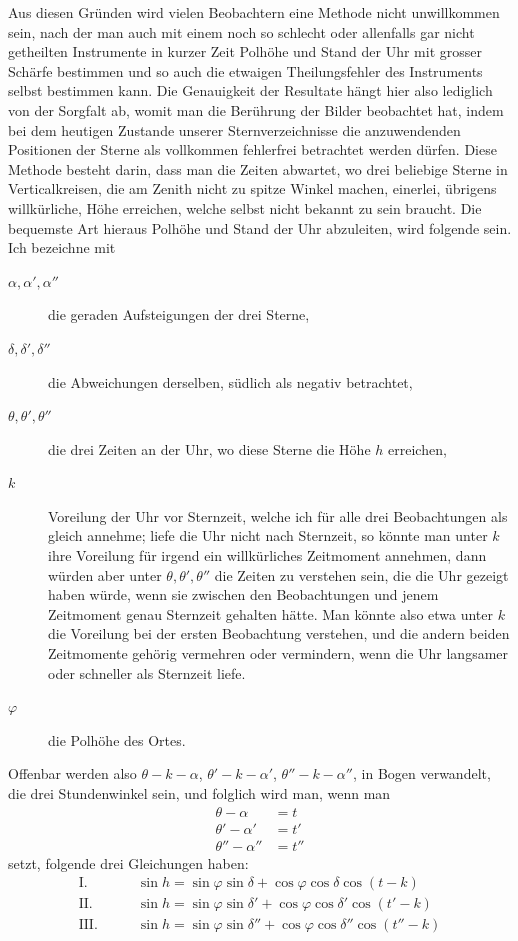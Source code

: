 Aus diesen Gründen wird vielen Beobachtern eine Methode nicht unwillkommen
sein, nach der man auch mit einem noch so schlecht oder allenfalls gar
nicht getheilten Instrumente in kurzer Zeit Polhöhe und Stand der Uhr mit
grosser Schärfe bestimmen und so auch die etwaigen Theilungsfehler des Instruments
selbst bestimmen kann. Die Genauigkeit der Resultate hängt hier also
lediglich von der Sorgfalt ab, womit man die Berührung der Bilder beobachtet
hat, indem bei dem heutigen Zustande unserer Sternverzeichnisse die anzuwendenden
Positionen der Sterne als vollkommen fehlerfrei betrachtet werden dürfen.
Diese Methode besteht darin, dass man die Zeiten abwartet, wo drei beliebige
Sterne in Verticalkreisen, die am Zenith nicht zu spitze Winkel machen, einerlei,
übrigens willkürliche, Höhe erreichen, welche selbst nicht bekannt zu sein
%
braucht. Die bequemste Art hieraus Polhöhe und Stand der Uhr abzuleiten,
wird folgende sein. Ich bezeichne mit
\begin{description}
\item[$\alpha,\alpha',\alpha''$] die geraden Aufsteigungen der drei Sterne,
\item[$\delta,\delta',\delta''$] die Abweichungen derselben, südlich als negativ betrachtet,
\item[$\theta,\theta',\theta''$] die drei Zeiten an der Uhr, wo diese Sterne die Höhe $h$ erreichen,
\item[$k$] Voreilung der Uhr vor Sternzeit, welche ich für alle drei Beobachtungen
als gleich annehme; liefe die Uhr nicht nach Sternzeit, so könnte
man unter $k$ ihre Voreilung für irgend ein willkürliches Zeitmoment annehmen,
dann würden aber unter $\theta,\theta',\theta''$ die Zeiten zu verstehen sein,
die die Uhr gezeigt haben würde, wenn sie zwischen den Beobachtungen
und jenem Zeitmoment genau Sternzeit gehalten hätte. Man könnte
also etwa unter $k$ die Voreilung bei der ersten Beobachtung verstehen,
und die andern beiden Zeitmomente gehörig vermehren oder vermindern,
wenn die Uhr langsamer oder schneller als Sternzeit liefe.
\item[$\varphi$] die Polhöhe des Ortes.
\end{description}
Offenbar werden also $\theta-k-\alpha$, $\theta'-k-\alpha'$, $\theta''-k-\alpha''$, in Bogen verwandelt,
die drei Stundenwinkel sein, und folglich wird man, wenn man
\[
\begin{aligned}
\theta-\alpha&=t\\
\theta'-\alpha'&=t'\\
\theta''-\alpha''&=t''
\end{aligned}
\]
setzt, folgende drei Gleichungen haben:
\[
\begin{aligned}
\mathrm{I.}\qquad&\sin h=\sin\varphi\sin\delta+\cos\varphi\cos\delta\cos(t-k)\\
\mathrm{II.}\qquad&\sin h=\sin\varphi\sin\delta'+\cos\varphi\cos\delta'\cos(t'-k)\\
\mathrm{III.}\qquad&\sin h=\sin\varphi\sin\delta''+\cos\varphi\cos\delta''\cos(t''-k)
\end{aligned}
\]

